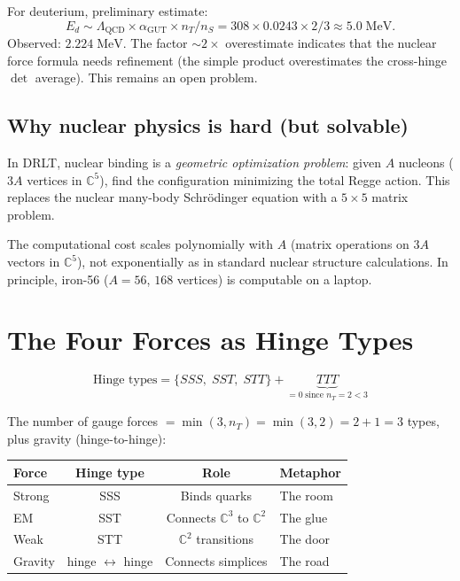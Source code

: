 \documentclass[12pt]{article}
\theoremstyle{remark}
\begin{document}
For deuterium, preliminary estimate:
\begin{equation}
E_d \sim \Lambda_\text{QCD} \times \alpha_\text{GUT} \times n_T/n_S = 308 \times 0.0243 \times 2/3 \approx 5.0\;\text{MeV}.
\end{equation}
Observed: $2.224\;\text{MeV}$. The factor $\sim 2\times$ overestimate indicates that the nuclear force formula needs refinement (the simple product overestimates the cross-hinge $\det$ average). This remains an open problem.

\subsection{Why nuclear physics is hard (but solvable)}

In DRLT, nuclear binding is a \emph{geometric optimization problem}: given $A$ nucleons ($3A$ vertices in $\mathbb{C}^5$), find the configuration minimizing the total Regge action. This replaces the nuclear many-body Schr\"odinger equation with a $5 \times 5$ matrix problem.

The computational cost scales polynomially with $A$ (matrix operations on $3A$ vectors in $\mathbb{C}^5$), not exponentially as in standard nuclear structure calculations. In principle, iron-56 ($A = 56$, $168$ vertices) is computable on a laptop.

\section{The Four Forces as Hinge Types}

\begin{equation}
\text{Hinge types} = \{SSS,\; SST,\; STT\} + \underbrace{TTT}_{= 0\;\text{since } n_T = 2 < 3}
\end{equation}

The number of gauge forces $= \min(3, n_T) = \min(3, 2) = 2 + 1 = 3$ types, plus gravity (hinge-to-hinge):

\begin{center}
\begin{tabular}{lccl}
\hline
Force & Hinge type & Role & Metaphor \\
\hline
Strong & SSS & Binds quarks & The room \\
EM & SST & Connects $\mathbb{C}^3$ to $\mathbb{C}^2$ & The glue \\
Weak & STT & $\mathbb{C}^2$ transitions & The door \\
Gravity & hinge $\leftrightarrow$ hinge & Connects simplices & The road \\
\hline
\end{tabular}
\end{center}
\end{document}
